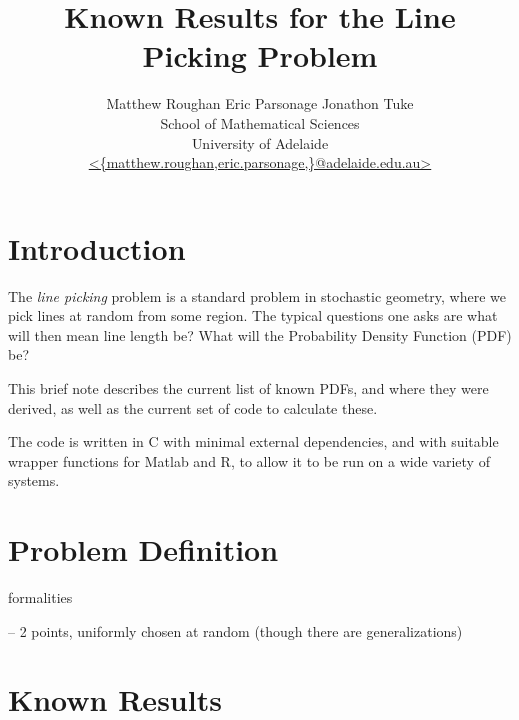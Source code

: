 \documentclass{article}
\newcommand{\titlestr}{Known Results for the Line Picking Problem}
\begin{document}
\title{\titlestr}
\author{Matthew Roughan \;\;\; Eric Parsonage \;\;\; Jonathon Tuke \\
 School of Mathematical Sciences \\
 University of Adelaide \\
 \url{ <{matthew.roughan,eric.parsonage,}@adelaide.edu.au> } }
\maketitle

\begin{abstract}

\end{abstract}

\section{Introduction}

The {\em line picking} problem is a standard problem in stochastic
geometry, where we pick lines at random from some region. The typical
questions one asks are what will then mean line length be? What will
the Probability Density Function (PDF) be?

This brief note describes the current list of known PDFs, and where
they were derived, as well as the current set of code to calculate
these. 

The code is written in C with minimal external dependencies, and with
suitable wrapper functions for Matlab and R, to allow it to be run on
a wide variety of systems.


\section{Problem Definition}

formalities

  -- 2 points, uniformly chosen at random (though there are
  generalizations)


\section{Known Results}
\label{sec:known}
\end{document}
